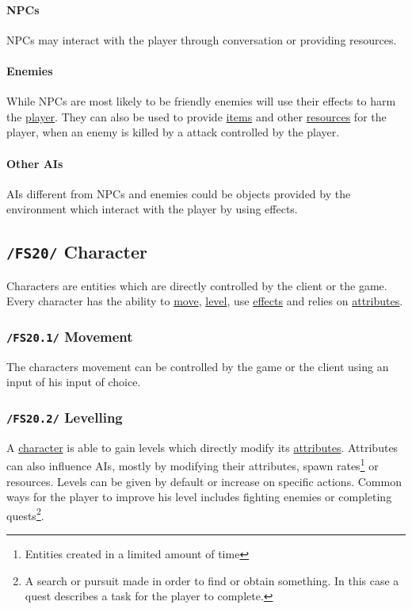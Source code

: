 \documentclass[11pt]{article}
\begin{document}
\paragraph{NPCs}
NPCs may interact with the player through conversation or providing resources.
\paragraph{Enemies}
While NPCs are most likely to be friendly enemies will use their effects to harm the \hyperref[subsec:fs60player]{player}.
They can also be used to provide \hyperref[subsec:fs41items]{items} and other \hyperref[subsec:fs40resources]{resources} for the player, when an enemy is killed by a attack controlled by the player.
\paragraph{Other AIs}
AIs different from NPCs and enemies could be objects provided by the environment which interact with the player by using effects.
\subsection{\texttt{/FS20/} Character}\label{subsec:fs20character}
Characters are entities which are directly controlled by the client or the game. Every character has the ability to \hyperref[subsec:fs201movement]{move}, \hyperref[subsec:fs202levelling]{level}, use \hyperref[subsec:fs30effects]{effects} and relies on \hyperref[subsec:fs50attributes]{attributes}.
\subsubsection{\texttt{/FS20.1/} Movement}\label{subsec:fs201movement}
The characters movement can be controlled by the game or the client using an input of his input of choice.
\subsubsection{\texttt{/FS20.2/} Levelling}\label{subsec:fs202levelling}
A \hyperref[subsec:fs20character]{character} is able to gain levels which directly modify its \hyperref[subsec:fs50attributes]{attributes}.
Attributes can also influence AIs, mostly by modifying their attributes, spawn rates\footnote{Entities created in a limited amount of time} or resources.
Levels can be given by default or increase on specific actions. Common ways for the player to improve his level includes fighting enemies or completing quests\footnote{A search or pursuit made in order to find or obtain something. In this case a quest describes a task for the player to complete.}.
\end{document}
